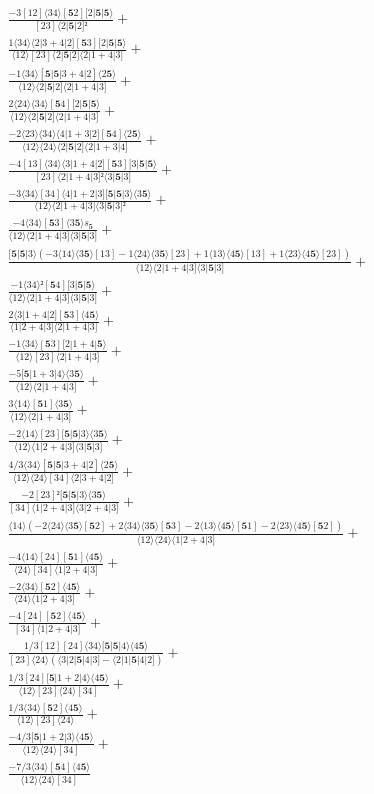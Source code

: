\documentclass[varwidth, border=5pt]{standalone}
\begin{document}
\begin{my}
$\begin{gathered}
\scriptscriptstyle\frac{-3[12]⟨34⟩[𝟓2][2|𝟓|𝟓⟩}{[23]⟨2|𝟓|2]²} +\\
\scriptscriptstyle\frac{1⟨34⟩⟨2|3+4|2][𝟓3][2|𝟓|𝟓⟩}{⟨12⟩[23]⟨2|𝟓|2]⟨2|1+4|3]} +\\
\scriptscriptstyle\frac{-1⟨34⟩[𝟓|𝟓|3+4|2]⟨2𝟓⟩}{⟨12⟩⟨2|𝟓|2]⟨2|1+4|3]} +\\
\scriptscriptstyle\frac{2⟨24⟩⟨34⟩[𝟓4][2|𝟓|𝟓⟩}{⟨12⟩⟨2|𝟓|2]⟨2|1+4|3]} +\\
\scriptscriptstyle\frac{-2⟨23⟩⟨34⟩⟨4|1+3|2][𝟓4]⟨2𝟓⟩}{⟨12⟩⟨24⟩⟨2|𝟓|2]⟨2|1+3|4]} +\\
\scriptscriptstyle\frac{-4[13]⟨34⟩⟨3|1+4|2][𝟓3][3|𝟓|𝟓⟩}{[23]⟨2|1+4|3]²⟨3|𝟓|3]} +\\
\scriptscriptstyle\frac{-3⟨34⟩[34]⟨4|1+2|3][𝟓|𝟓|3⟩⟨3𝟓⟩}{⟨12⟩⟨2|1+4|3]⟨3|𝟓|3]²} +\\
\scriptscriptstyle\frac{-4⟨34⟩[𝟓3]⟨3𝟓⟩s_{𝟓}}{⟨12⟩⟨2|1+4|3]⟨3|𝟓|3]} +\\
\scriptscriptstyle\frac{[𝟓|𝟓|3⟩(-3⟨14⟩⟨3𝟓⟩[13]-1⟨24⟩⟨3𝟓⟩[23]+1⟨13⟩⟨4𝟓⟩[13]+1⟨23⟩⟨4𝟓⟩[23])}{⟨12⟩⟨2|1+4|3]⟨3|𝟓|3]} +\\
\scriptscriptstyle\frac{-1⟨34⟩²[𝟓4][3|𝟓|𝟓⟩}{⟨12⟩⟨2|1+4|3]⟨3|𝟓|3]} +\\
\scriptscriptstyle\frac{2⟨3|1+4|2][𝟓3]⟨4𝟓⟩}{⟨1|2+4|3]⟨2|1+4|3]} +\\
\scriptscriptstyle\frac{-1⟨34⟩[𝟓3][2|1+4|𝟓⟩}{⟨12⟩[23]⟨2|1+4|3]} +\\
\scriptscriptstyle\frac{-5[𝟓|1+3|4⟩⟨3𝟓⟩}{⟨12⟩⟨2|1+4|3]} +\\
\scriptscriptstyle\frac{3⟨14⟩[𝟓1]⟨3𝟓⟩}{⟨12⟩⟨2|1+4|3]} +\\
\scriptscriptstyle\frac{-2⟨14⟩[23][𝟓|𝟓|3⟩⟨3𝟓⟩}{⟨12⟩⟨1|2+4|3]⟨3|𝟓|3]} +\\
\scriptscriptstyle\frac{4/3⟨34⟩[𝟓|𝟓|3+4|2]⟨2𝟓⟩}{⟨12⟩⟨24⟩[34]⟨2|3+4|2]} +\\
\scriptscriptstyle\frac{-2[23]²[𝟓|𝟓|3⟩⟨3𝟓⟩}{[34]⟨1|2+4|3]⟨3|2+4|3]} +\\
\scriptscriptstyle\frac{⟨14⟩(-2⟨24⟩⟨3𝟓⟩[𝟓2]+2⟨34⟩⟨3𝟓⟩[𝟓3]-2⟨13⟩⟨4𝟓⟩[𝟓1]-2⟨23⟩⟨4𝟓⟩[𝟓2])}{⟨12⟩⟨24⟩⟨1|2+4|3]} +\\
\scriptscriptstyle\frac{-4⟨14⟩[24][𝟓1]⟨4𝟓⟩}{⟨24⟩[34]⟨1|2+4|3]} +\\
\scriptscriptstyle\frac{-2⟨34⟩[𝟓2]⟨4𝟓⟩}{⟨24⟩⟨1|2+4|3]} +\\
\scriptscriptstyle\frac{-4[24][𝟓2]⟨4𝟓⟩}{[34]⟨1|2+4|3]} +\\
\scriptscriptstyle\frac{1/3[12][24]⟨34⟩[𝟓|𝟓|4⟩⟨4𝟓⟩}{[23]⟨24⟩(⟨3|2|𝟓|4|3]-⟨2|1|𝟓|4|2])} +\\
\scriptscriptstyle\frac{1/3[24][𝟓|1+2|4⟩⟨4𝟓⟩}{⟨12⟩[23]⟨24⟩[34]} +\\
\scriptscriptstyle\frac{1/3⟨34⟩[𝟓2]⟨4𝟓⟩}{⟨12⟩[23]⟨24⟩} +\\
\scriptscriptstyle\frac{-4/3[𝟓|1+2|3⟩⟨4𝟓⟩}{⟨12⟩⟨24⟩[34]} +\\
\scriptscriptstyle\frac{-7/3⟨34⟩[𝟓4]⟨4𝟓⟩}{⟨12⟩⟨24⟩[34]} \phantom{+}
\end{gathered}$
\end{my}
\end{document}
